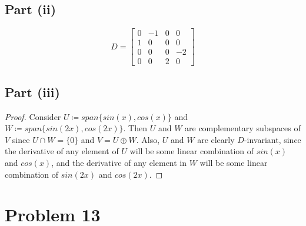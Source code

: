 \documentclass{article}
\begin{document}
\subsection*{Part (ii)}

$$D = \begin{bmatrix} 0 & -1 & 0 & 0 \\ 1 & 0 & 0 & 0 \\ 0 & 0 & 0 & -2 \\ 0 & 0 & 2 & 0 \end{bmatrix}$$

\subsection*{Part (iii)}

\begin{proof}
Consider $U \coloneqq span\{sin(x), cos(x)\}$ and $W \coloneqq span\{sin(2x), cos(2x)\}$. Then $U$ and $W$ are complementary subspaces of $V$ since $U \cap W = \{0\}$ and $V = U \oplus W$. Also, $U$ and $W$ are clearly $D$-invariant, since the derivative of any element of $U$ will be some linear combination of $sin(x)$ and $cos(x)$, and the derivative of any element in $W$ will be some linear combination of $sin(2x)$ and $cos(2x)$.
\end{proof}


\section*{Problem 13}
\end{document}
